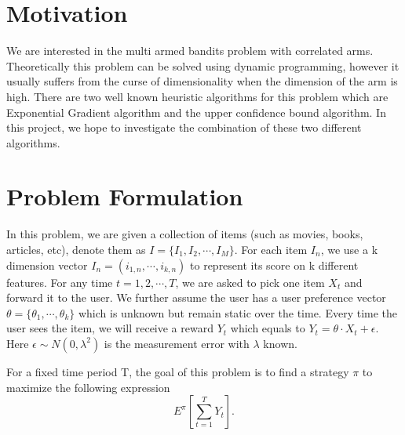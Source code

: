 \documentclass{article}
\begin{document}
 


\section{Motivation}
We are interested in the multi armed bandits problem with correlated arms. Theoretically this problem can be solved using dynamic programming, however it usually suffers from the curse of dimensionality when the dimension of the arm is high. There are two well known heuristic algorithms for this problem which are Exponential Gradient algorithm and the upper confidence bound algorithm. In this project, we hope to investigate the combination of these two different algorithms.


\section{Problem Formulation}
In this problem, we are given a collection of items (such as movies, books, articles, etc), denote them as $I=\{I_{1},I_{2},\cdots,I_{M}\}$. For each item $I_{n}$, we use a k dimension vector $I_{n}=(i_{1,n},\cdots,i_{k,n})$ to represent its score on k different features. For any time $t=1,2,\cdots,T$, we are asked to pick one item $X_{t}$ and forward it to the user. We further assume the user has a user preference vector $\theta=\{\theta_{1},\cdots,\theta_{k}\}$ which is unknown but remain static over the time. Every time the user sees the item, we will receive a reward $Y_{t}$ which equals to $Y_{t} = \theta \cdot X_{t}+\epsilon$. Here $\epsilon\sim N(0,\lambda^{2})$ is the measurement error with $\lambda$ known. 

For a fixed time period T, the goal of this problem is to find a strategy $\pi$ to maximize the following expression
\begin{equation}
E^{\pi}\left[\sum_{t=1}^{T} Y_{t}\right].
\end{equation}
\end{document}
